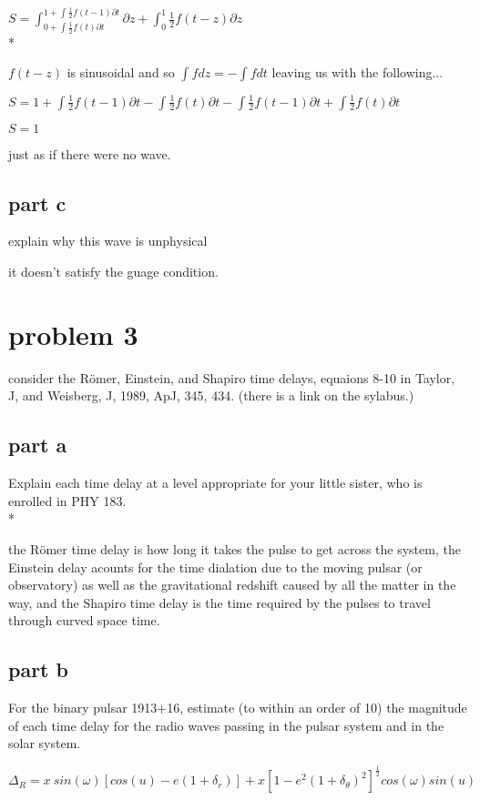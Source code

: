 \documentclass{article}
\begin{document}
$S=\int_{0+\int \frac{1}{2}f(t)\partial t}^{1+\int \frac{1}{2}f(t-1)\partial t}\partial z+\int_{0}^{1}\frac{1}{2}f(t-z)\partial z$
\\*

$f(t-z)$ is sinusoidal and so $\int f dz=-\int f dt$ leaving us with the following...

$S=1+\int \frac{1}{2}f(t-1)\partial t - \int \frac{1}{2}f(t)\partial t-\int \frac{1}{2}f(t-1)\partial t+\int \frac{1}{2}f(t)\partial t$

$S=1$

just as if there were no wave.

\subsection{part c}
explain why this wave is unphysical

it doesn't satisfy the guage condition.

\newpage

\section{problem 3}
consider the R\"{o}mer, Einstein, and Shapiro time delays, equaions 8-10 in Taylor, J, and Weisberg, J, 1989, ApJ, 345, 434. (there is a link on the sylabus.)

\subsection{part a}
Explain each time delay at a level appropriate for your little sister, who is enrolled in PHY 183.
\\*

the R\"{o}mer time delay is how long it takes the pulse to get across the system, the Einstein delay acounts for the time dialation due to the moving pulsar (or observatory) as well as the gravitational redshift caused by all the matter in the way, and the Shapiro time delay is the time required by the pulses to travel through curved space time. 

\subsection{part b}
For the binary pulsar 1913+16, estimate (to within an order of 10) the magnitude of each time delay for the radio waves passing in the pulsar system and in the solar system. 

$\Delta_R=x\ sin(\omega)[cos(u)-e(1+\delta_r)]+x[1-e^2(1+\delta_\theta )^2]^{\frac{1}{2}}cos(\omega)sin(u)$
\end{document}
